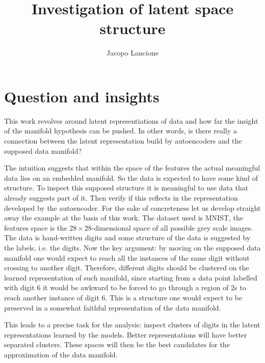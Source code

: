 \documentclass[twocolumn,gsifonts,twoside]{gsipaper}
\begin{document}
\title{\textbf{Investigation of latent space structure}}



\author{Jacopo Lancione}
\address{Università di Torino, jacopo.lancione@edu.unito.it}

\maketitle

\section{Question and insights}
This work revolves around latent representiations of data and how far the insight of the manifold hypothesis can be pushed. In other words, is there really a connection between the latent representation build by autoencoders and the supposed data manifold?

The intuition suggests that within the space of the features the actual meaningful data lies on an embedded manifold. So the data is expected to have some kind of structure. To inspect this supposed structure it is meaningful to use data that already suggests part of it. Then verify if this reflects in the representation developed by the autoencoder. For the sake of concreteness let us develop straight away the example at the basis of this work. The dataset used is MNIST, the features space is the $28\times28$-dimensional space of all possible grey scale images. The data is hand-written digits and some structure of the data is suggested by the labels, i.e. the digits. Now the key argument: by moving on the supposed data manifold one would expect to reach all the instances of the same digit without crossing to another digit. Therefore, different digits should be clustered on the learned representation of such manifold, since starting from a data point labelled with digit 6 it would be awkward to be forced to go through a region of 2s to reach another instance of digit 6. This is a structure one would expect to be preserved in a somewhat faithful representation of the data manifold.

This leads to a precise task for the analysis: inspect clusters of digits in the latent representations learned by the models. Better representations will have better separated clusters. These spaces will then be the best candidates for the approximation of the data manifold.
\end{document}
